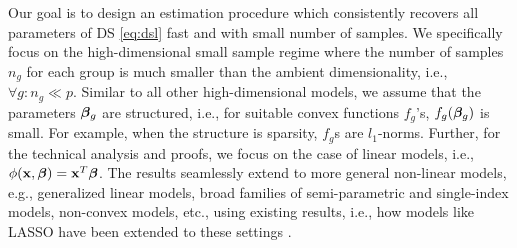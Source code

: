 Our goal is to design an estimation procedure which consistently recovers all parameters of DS \eqref{eq:dsl} fast and with small number of samples.
We specifically focus on the high-dimensional small sample regime where the number of samples $n_g$ for each group is much smaller than the ambient 
dimensionality, i.e., $\forall g: n_g \ll p$. Similar to all other high-dimensional models, we assume that the parameters $\boldsymbol{\beta}_g$ are structured, i.e., for suitable convex functions $f_g$'s, $f_g(\boldsymbol{\beta}_g)$ is small.
For example, when the structure is sparsity, $f_g$s are $l_1$-norms. Further, for the technical analysis and proofs,
we focus on the case of linear models, i.e., $\phi(\mathbf{x},\boldsymbol{\beta}) = \mathbf{x}^T \boldsymbol{\beta}$. The results
seamlessly extend to more general non-linear models, e.g., generalized linear models, broad families of semi-parametric and single-index models, non-convex models, etc., using
existing results, i.e., how models like LASSO have been extended to these settings \cite{Kakade2010-st, negahban2012restricted, Plan2013-nx, Plan2016-de, Yang2016-zd}. %



